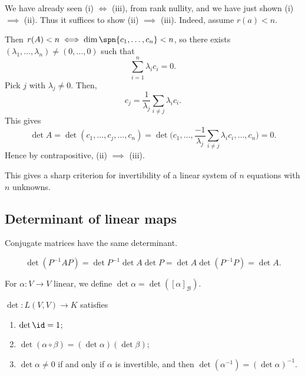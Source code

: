 \documentclass[12pt]{article}
\begin{document}
\begin{proofbox}
	We have already seen (i) $\iff$ (iii), from rank nullity, and we have just shown (i) $\implies$ (ii). Thus it suffices to show (ii) $\implies$ (iii). Indeed, assume $r(a) < n$.

		Then $r(A) < n \iff \dim \spn \{c_1, \ldots, c_n\} < n$, so there exists $(\lambda_1, \ldots, \lambda_n) \neq (0, \ldots, 0)$ such that
			\[
			\sum_{i = 1}^{n} \lambda_i c_i = 0
			.\]
			Pick $j$ with $\lambda_j \neq 0$. Then,
			\[
			c_j = \frac{1}{\lambda_j} \sum_{i \neq j}\lambda_i c_i
			.\]
			This gives
			\[
				\det A = \det(c_1, \ldots, c_j, \ldots, c_n) = \det \Biggl( c_1, \ldots, \frac{-1}{\lambda_j} \sum_{i \neq j}\lambda_i c_i, \ldots, c_n \Biggr) = 0
			.\]
			Hence by contrapositive, (ii) $\implies$ (iii).
\end{proofbox}

\begin{remark}
	This gives a sharp criterion for invertibility of a linear system of $n$ equations with $n$ unknowns.
\end{remark}

\subsection{Determinant of linear maps}%
\label{sub:determinant_of_linear_maps}

\begin{lemma}
	Conjugate matrices have the same determinant.
\end{lemma}

\begin{proofbox}
	\[
		\det(P^{-1}AP) = \det P^{-1} \det A \det P = \det A \det (P^{-1}P) = \det A
	.\]
\end{proofbox}

\begin{definition}
	For $\alpha : V \to V$ linear, we define $\det \alpha = \det([\alpha]_{\mathcal{B}})$.
\end{definition}

\begin{theorem}
	$\det : L(V, V) \to K$ satisfies
	\begin{enumerate}[\normalfont(i)]
		\item $\det \id = 1$;
		\item $\det(\alpha \circ \beta) = (\det \alpha) (\det \beta)$;
		\item $\det \alpha \neq 0$ if and only if $\alpha$ is invertible, and then $\det(\alpha^{-1}) = (\det \alpha)^{-1}$.
	\end{enumerate}
\end{theorem}
\end{document}
